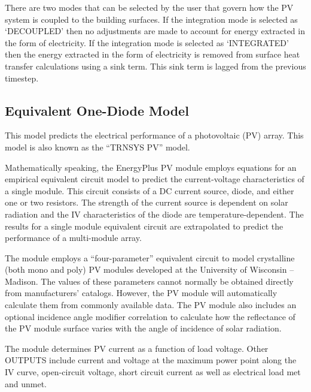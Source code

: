 There are two modes that can be selected by the user that govern how the PV system is coupled to the building surfaces. If the integration mode is selected as `DECOUPLED' then no adjustments are made to account for energy extracted in the form of electricity. If the integration mode is selected as `INTEGRATED' then the energy extracted in the form of electricity is removed from surface heat transfer calculations using a sink term. This sink term is lagged from the previous timestep.

\subsection{Equivalent One-Diode Model}\label{equivalent-one-diode-model}

This model predicts the electrical performance of a photovoltaic (PV) array. This model is also known as the ``TRNSYS PV'' model.

Mathematically speaking, the EnergyPlus PV module employs equations for an empirical equivalent circuit model to predict the current-voltage characteristics of a single module. This circuit consists of a DC current source, diode, and either one or two resistors. The strength of the current source is dependent on solar radiation and the IV characteristics of the diode are temperature-dependent. The results for a single module equivalent circuit are extrapolated to predict the performance of a multi-module array.

The module employs a ``four-parameter'' equivalent circuit to model crystalline (both mono and poly) PV modules developed at the University of Wisconsin -- Madison. The values of these parameters cannot normally be obtained directly from manufacturers' catalogs. However, the PV module will automatically calculate them from commonly available data. The PV module also includes an optional incidence angle modifier correlation to calculate how the reflectance of the PV module surface varies with the angle of incidence of solar radiation.

The module determines PV current as a function of load voltage. Other OUTPUTS include current and voltage at the maximum power point along the IV curve, open-circuit voltage, short circuit current as well as electrical load met and unmet.

